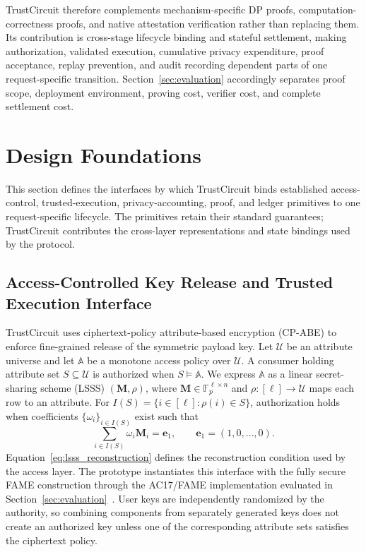 \documentclass[10pt,journal,compsoc]{IEEEtran}
\begin{document}
TrustCircuit therefore complements mechanism-specific DP proofs, computation-correctness proofs, and native attestation verification rather than replacing them. Its contribution is cross-stage lifecycle binding and stateful settlement, making authorization, validated execution, cumulative privacy expenditure, proof acceptance, replay prevention, and audit recording dependent parts of one request-specific transition. Section~\ref{sec:evaluation} accordingly separates proof scope, deployment environment, proving cost, verifier cost, and complete settlement cost.
\section{Design Foundations}\label{sec:preliminaries}

This section defines the interfaces by which TrustCircuit binds established access-control, trusted-execution, privacy-accounting, proof, and ledger primitives to one request-specific lifecycle. The primitives retain their standard guarantees; TrustCircuit contributes the cross-layer representations and state bindings used by the protocol.

\subsection{Access-Controlled Key Release and Trusted Execution Interface}
\label{subsec:access_tee}

TrustCircuit uses ciphertext-policy attribute-based encryption (CP-ABE) to enforce fine-grained release of the symmetric payload key. Let $\mathcal{U}$ be an attribute universe and let $\mathbb{A}$ be a monotone access policy over $\mathcal{U}$. A consumer holding attribute set $S\subseteq\mathcal{U}$ is authorized when $S\models\mathbb{A}$. We express $\mathbb{A}$ as a linear secret-sharing scheme (LSSS) $(\mathbf{M},\rho)$, where $\mathbf{M}\in\mathbb{F}_{p}^{\ell\times n}$ and $\rho:[\ell]\rightarrow\mathcal{U}$ maps each row to an attribute. For
$I(S)=\{i\in[\ell]:\rho(i)\in S\}$, authorization holds when coefficients $\{\omega_i\}_{i\in I(S)}$ exist such that
\begin{equation}
\sum_{i\in I(S)}
\omega_i\mathbf{M}_i
=
\mathbf{e}_1,
\qquad
\mathbf{e}_1=(1,0,\ldots,0).
\label{eq:lsss_reconstruction}
\end{equation}
Equation~\eqref{eq:lsss_reconstruction} defines the reconstruction condition used by the access layer. The prototype instantiates this interface with the fully secure FAME construction through the AC17/FAME implementation evaluated in Section~\ref{sec:evaluation}~\cite{agrawal2017fame}. User keys are independently randomized by the authority, so combining components from separately generated keys does not create an authorized key unless one of the corresponding attribute sets satisfies the ciphertext policy.
\end{document}
